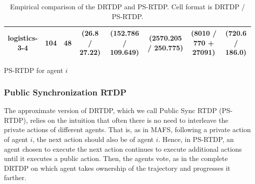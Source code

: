 \documentclass[letterpaper]{article} %
\theoremstyle{remark}
\begin{document}
\begin{table}[]
\begin{tabular}{|c|c|c||c|c|c|c|c|}
\textbf{logistics-3-4} & 104                 & 48                & (26.8 / 27.22)     & (152.786 / 109.649)                         & (2570.205 / 250.775)                      & (8010 / 770 + 27091)             & (720.6 / 186.0)           \\ \hline
\end{tabular}
\caption{Empirical comparison of the DRTDP and PS-RTDP. Cell format is DRTDP / PS-RTDP.}
\label{tbl:results}
\end{table}


\begin{algorithm}[t!]
\footnotesize
\caption{PS-RTDP for agent $i$}
\label{alg:PORTDP}

\end{algorithm}




\subsubsection{Public Synchronization RTDP}

The approximate version of DRTDP, which we call Public Sync RTDP (PS-RTDP), relies on the intuition that often there is no need to interleave the private actions of different agents. That is, as in MAFS, following a private action of agent $i$, the next action should also be of agent $i$.
Hence, in PS-RTDP, an agent chosen to execute the next action continues to execute additional actions until it executes a public action. Then, the agents vote, as in the complete DRTDP on which agent takes ownership of the trajectory and progresses it farther.
\end{document}
